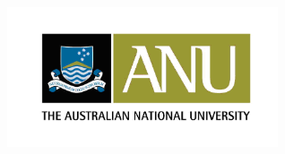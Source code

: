 
\begin{titlepage}

\begin{addmargin}[-1cm]{-1cm}
\begin{center} 
\large

\hfill
\vfill
\begingroup
\parbox{0.9\linewidth}{\center\color{Maroon}\spacedallcaps{\myTitle}  %
} \vspace{1cm}
\endgroup
\spacedallcaps{\newline\myName} \\
\\ \bigskip%
\\

\vfill

\includegraphics[width=8cm]{gfx/ANU_logo} \\ \medskip %

\mySubtitle \\%
\myDegree \\
\myFaculty \\
\myUni \\ \bigskip

\myTime %

\vfill

\end{center}
\end{addmargin}

\end{titlepage}